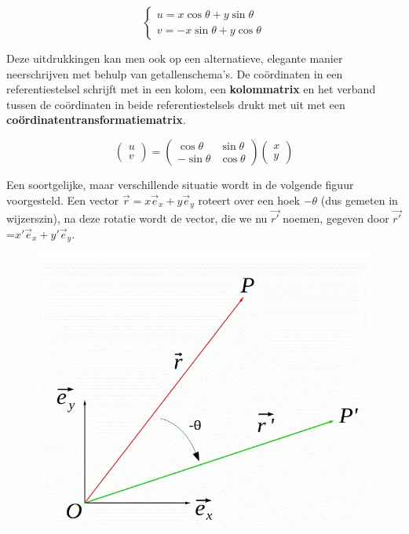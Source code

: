 \[   
\left\{ \begin{array}{l}
u= x \cos \theta + y \sin \theta \\
v= -x \sin \theta + y \cos \theta \end{array} \right.
\]

Deze uitdrukkingen kan men ook op een alternatieve, elegante manier neerschrijven met behulp van getallenschema's. De co\"{o}rdinaten in een referentiestelsel schrijft met in een kolom, een {\bf kolommatrix} en het verband tussen de co\"{o}rdinaten in beide referentiestelsels drukt met uit met een {\bf co\"{o}rdinatentransformatiematrix}.

\[
\left( \begin{array}{l} u \\ v \end{array} \right)= \left( \begin{array}{rr} \cos \theta & \sin \theta \\ -\sin \theta & \cos \theta \end{array} \right) \left( \begin{array}{l} x \\ y \end{array} \right) 
\]

Een soortgelijke, maar verschillende situatie wordt in de volgende figuur voorgesteld. Een vector $\vec{r}=x \vec{e}_x + y \vec{e}_y$ roteert over een hoek $-\theta$ (dus gemeten in wijzerszin), na deze rotatie wordt de vector, die we nu $\vec{r'}$ noemen, gegeven door $\vec{r'}$=$x' \vec{e}_x + y' \vec{e}_y$. 

\begin{figure}[h]
	\begin{center}
		\includegraphics[scale=0.5]{5_vglen_ongelijkheden_stelsels_matrices/inputs/matrices-fig-2}
	\end{center}
\end{figure}

